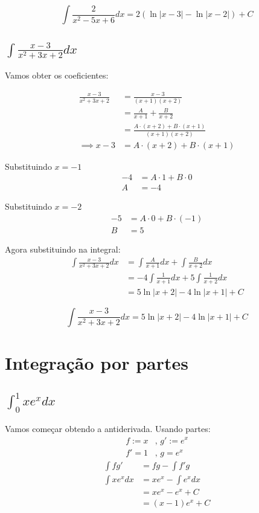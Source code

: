 \documentclass[12pt]{article}
\theoremstyle{definition}
\begin{document}
\[
    \boxed{
        \int{\frac{2}{x^2-5x+6}dx} = 2(\ln{|x-3|} - \ln{|x-2|}) + C
    }
\]

\subsection{\(\int{\frac{x-3}{x^2+3x+2}dx}\)}
Vamos obter os coeficientes:

\begin{align*}
    \frac{x-3}{x^2+3x+2}
    &= \frac{x-3}{(x+1)(x+2)} \\
    &= \frac{A}{x+1} + \frac{B}{x+2} \\
    &= \frac{A\cdot(x+2) + B\cdot (x+1)}{(x+1)(x+2)} \\
    \implies x-3
    &= A\cdot(x+2) + B\cdot (x+1)
\end{align*}

Substituindo \( x = -1 \)
\begin{align*}
    -4 &= A\cdot 1 + B \cdot 0 \\
    A &= -4
\end{align*}

Substituindo \( x = -2 \)
\begin{align*}
    -5 &= A \cdot 0 + B \cdot (-1) \\
    B &= 5
\end{align*}

Agora substituindo na integral:
\begin{align*}
    \int{\frac{x-3}{x^2+3x+2}dx}
    &= \int{\frac{A}{x+1}dx} + \int{\frac{B}{x+2}dx} \\
    &= -4\int{\frac{1}{x+1}dx} + 5\int{\frac{1}{x+2}dx} \\
    &= 5\ln{|x+2|} - 4\ln{|x+1|} + C
\end{align*}

\[
    \boxed{
        \int{\frac{x-3}{x^2+3x+2}dx} = 5\ln{|x+2|} - 4\ln{|x+1|} + C
    }
\]

\section{Integração por partes}
\subsection{\(\int_0^1 x e^x dx\)}
Vamos começar obtendo a antiderivada. Usando partes:
\begin{align*}
	f := x & \text{, } g' := e^x \\
	f' = 1 & \text{, } g = e^x   
\end{align*}
\begin{align*}
	\int f g'
	  & = fg - \int f' g     \\
	\int xe^x dx
	  & = xe^x - \int e^x dx \\
	  & = xe^x - e^x + C     \\
	  & = (x-1) e^x + C      
\end{align*}
\end{document}
